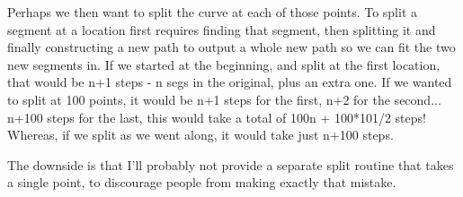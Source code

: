 \documentclass{book}
\begin{document}
Perhaps we then want to split the curve at each of those points.  To
split a segment at a location first requires finding that segment,
then splitting it and finally constructing a new path to output a whole
new path so we can fit the two new segments in.  If we started at the
beginning, and split at the first location, that would be n+1 steps - n
segs in the original, plus an extra one.  If we wanted to split at 100
points, it would be n+1 steps for the first, n+2 for the
second... n+100 steps for the last, this would take a total of 100n +
100*101/2 steps!  Whereas, if we split as we went along, it would take
just n+100 steps.

The downside is that I'll probably not provide a separate split
routine that takes a single point, to discourage people from making
exactly that mistake.
\end{document}
